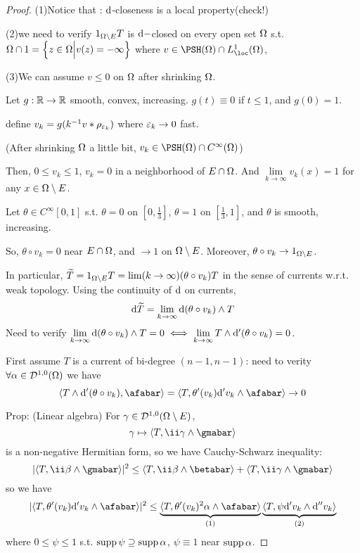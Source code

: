 \begin{proof}
(1)Notice that : $\mathrm{d}$-closeness is a local property(check!)

(2)we need to verify $1_{\Omega\setminus E}T$ is $\mathrm{d}-$closed on
every open set $\Omega$ s.t. $\Omega\cap 1=
\Big\{ z\in\Omega \Big| v(z)=-\infty \Big\}$ where $v\in\PSH(\Omg)\cap L^1_{\loc}(\Omg)$,

(3)We can assume $v\leq 0$ on $\Omega$ after shrinking $\Omega$.

Let $g:\mathbb{R}\to\mathbb{R}$ smooth, convex, increasing. $g(t)\equiv 0$ if $t\leq 1$,
and $g(0)=1$. %

define $v_k=g(k^{-1}v*\rho_{\varepsilon_k})$ where $\varepsilon_k\to 0$ fast.

(After shrinking $\Omega$ a little bit, $v_k\in\PSH(\Omg)\cap C^\infty(\Omg)$)

Then, $0\leq v_k\leq 1$, $v_k=0$ in a neighborhood of $E\cap\Omega$.
And $\lim\limits_{k\to\infty}v_k(x)=1$ for any $x\in\Omega\setminus E$.

Let $\theta\in C^\infty[0,1]$ s.t. 
$\theta =0$ on $[0,\frac{1}{3}]$, $\theta=1$ on $[\frac{1}{3},1]$,
 and $\theta$ is smooth, increasing. 
 
So, $\theta\circ v_k= 0$ near $E\cap \Omega $, and $\to 1$ on $\Omega\setminus E$.
Moreover, $\theta\circ v_k\to 1_{\Omega\setminus E}$.

In particular, $\widetilde{T}=1_{\Omega\setminus E}T
=\lim\limits(k\to\infty)(\theta\circ v_k)T$
in the sense of currents w.r.t. weak topology.
Using the continuity of $\mathrm{d}$ on currents,
$$
  \mathrm{d}\widetilde{T}
=\lim_{k\to\infty}\mathrm{d}(\theta\circ v_k)\wedge T
$$
Need to verify $\lim\limits_{k\to\infty}\mathrm{d}(\theta\circ v_k)\wedge T=0
\iff\lim\limits_{k\to\infty}T\wedge\mathrm{d}'(\theta\circ v_k)=0$.

First assume $T$ is a current of bi-degree $(n-1,n-1)$:
need to verity $\forall \alpha\in\mathcal{D}^{1,0}(\Omega)$ we have
$$
  \pair{T\wedge\td'(\theta\circ v_k)}{\afabar}
=
  \pair{T}{\theta'(v_k)\td'v_k\wedge\afabar}\to 0
$$

Prop: (Linear algebra) For $\gamma\in\mathcal{D}^{1,0}(\Omega\setminus E)$,
$$\gma\mapsto\pair{T}{\ii\gma\wedge\gmabar}$$
is a non-negative Hermitian form, so we have Cauchy-Schwarz inequality:
$$
  |\pair{T}{\ii\beta\wedge\gmabar}|^2
\leq
  \pair{T}{\ii\beta\wedge\betabar}
  +\pair{T}{\ii\gma\wedge\gmabar}
$$
so we have 
$$
  |\pair{T}{\theta'(v_k)\td'v_k\wedge\afabar}|^2
\leq
  \underbrace{
  \pair{T}{\theta'(v_k)^2\afa\wedge\afabar}
  }_{(1)}
  \underbrace{
  \pair{T}{\psi\td'v_k\wedge\td''v_k}
  }_{(2)}
$$
where $0\leq\psi\leq 1$ s.t. $\operatorname{supp}\psi\supseteq\operatorname{supp}\alpha$, $\psi\equiv 1$
near $\operatorname{supp}\alpha$.


\end{proof}
